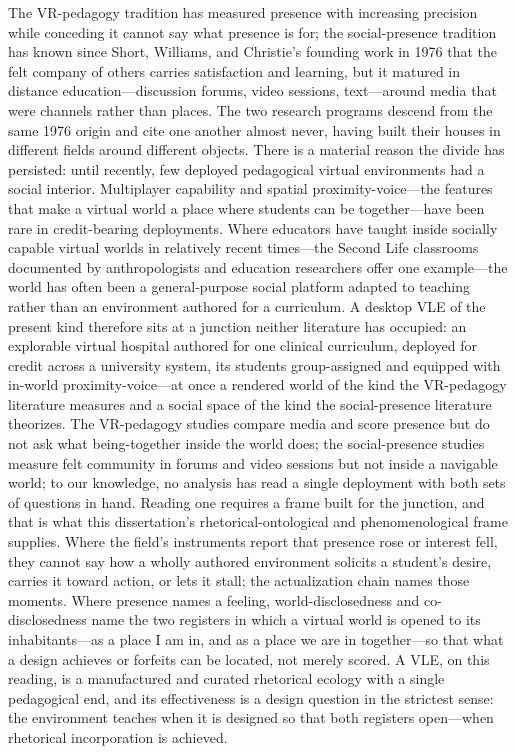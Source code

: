 The VR-pedagogy tradition has measured presence with increasing precision while
conceding it cannot say what presence is for; the social-presence tradition has
known since Short, Williams, and Christie's founding work in 1976 that the felt
company of others carries satisfaction and learning, but it matured in distance
education---discussion forums, video sessions, text---around media that were
channels rather than places. The two research programs descend from the same
1976 origin and cite one another almost never, having built their houses in
different fields around different objects. There is a material reason the
divide has persisted: until recently, few deployed pedagogical virtual
environments had a social interior. Multiplayer capability and spatial
proximity-voice---the features that make a virtual world a place where students
can be together---have been rare in credit-bearing deployments. Where educators
have taught inside socially capable virtual worlds in relatively recent
times---the Second Life classrooms documented by anthropologists and education
researchers offer one example---the world has often been a general-purpose
social platform adapted to teaching rather than an environment authored for a
curriculum. A desktop VLE of the present kind therefore sits at a junction
neither literature has occupied: an explorable virtual hospital authored for one
clinical curriculum, deployed for credit across a university system, its
students group-assigned and equipped with in-world proximity-voice---at once a
rendered world of the kind the VR-pedagogy literature measures and a social
space of the kind the social-presence literature theorizes. The VR-pedagogy
studies compare media and score presence but do not ask what being-together
inside the world does; the social-presence studies measure felt community in
forums and video sessions but not inside a navigable world; to our knowledge, no
analysis has read a single deployment with both sets of questions in hand.
Reading one requires a frame built for the junction, and that is what this
dissertation's rhetorical-ontological and phenomenological frame supplies. Where
the field's instruments report that presence rose or interest fell, they cannot
say how a wholly authored environment solicits a student's desire, carries it
toward action, or lets it stall; the actualization chain names those moments.
Where presence names a feeling, world-disclosedness and co-disclosedness name
the two registers in which a virtual world is opened to its inhabitants---as a
place I am in, and as a place we are in together---so that what a design
achieves or forfeits can be located, not merely scored. A VLE, on this reading,
is a manufactured and curated rhetorical ecology with a single pedagogical end,
and its effectiveness is a design question in the strictest sense: the
environment teaches when it is designed so that both registers open---when
rhetorical incorporation is achieved.

